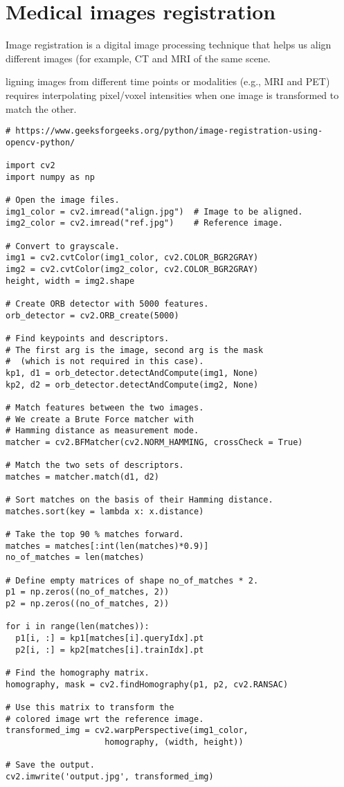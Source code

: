\chapter{Medical images registration}

Image registration is a digital image processing technique that helps us align different images (for example, \gls{CT} and \gls{MRI} of the same scene.

ligning images from different time points or modalities (e.g., MRI and PET) requires interpolating pixel/voxel intensities when one image is transformed to match the other.

\begin{verbatim}
# https://www.geeksforgeeks.org/python/image-registration-using-opencv-python/

import cv2
import numpy as np

# Open the image files.
img1_color = cv2.imread("align.jpg")  # Image to be aligned.
img2_color = cv2.imread("ref.jpg")    # Reference image.

# Convert to grayscale.
img1 = cv2.cvtColor(img1_color, cv2.COLOR_BGR2GRAY)
img2 = cv2.cvtColor(img2_color, cv2.COLOR_BGR2GRAY)
height, width = img2.shape

# Create ORB detector with 5000 features.
orb_detector = cv2.ORB_create(5000)

# Find keypoints and descriptors.
# The first arg is the image, second arg is the mask
#  (which is not required in this case).
kp1, d1 = orb_detector.detectAndCompute(img1, None)
kp2, d2 = orb_detector.detectAndCompute(img2, None)

# Match features between the two images.
# We create a Brute Force matcher with 
# Hamming distance as measurement mode.
matcher = cv2.BFMatcher(cv2.NORM_HAMMING, crossCheck = True)

# Match the two sets of descriptors.
matches = matcher.match(d1, d2)

# Sort matches on the basis of their Hamming distance.
matches.sort(key = lambda x: x.distance)

# Take the top 90 % matches forward.
matches = matches[:int(len(matches)*0.9)]
no_of_matches = len(matches)

# Define empty matrices of shape no_of_matches * 2.
p1 = np.zeros((no_of_matches, 2))
p2 = np.zeros((no_of_matches, 2))

for i in range(len(matches)):
  p1[i, :] = kp1[matches[i].queryIdx].pt
  p2[i, :] = kp2[matches[i].trainIdx].pt

# Find the homography matrix.
homography, mask = cv2.findHomography(p1, p2, cv2.RANSAC)

# Use this matrix to transform the
# colored image wrt the reference image.
transformed_img = cv2.warpPerspective(img1_color,
                    homography, (width, height))

# Save the output.
cv2.imwrite('output.jpg', transformed_img)

\end{verbatim}